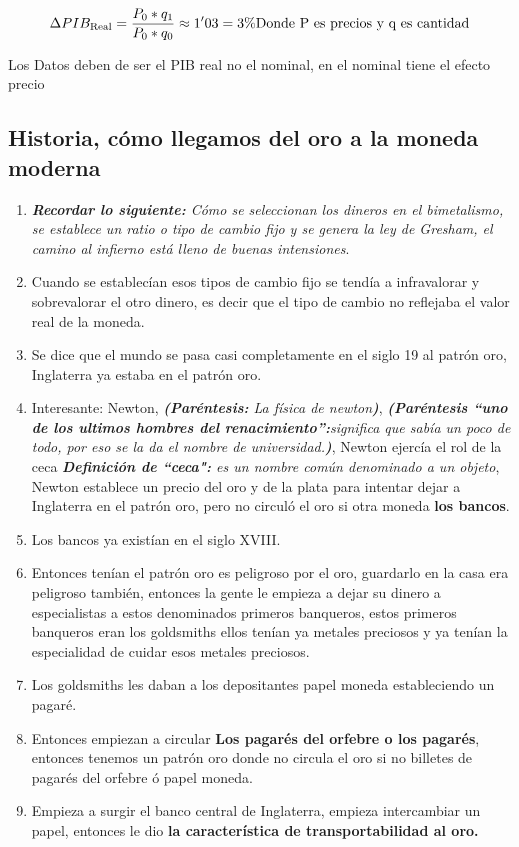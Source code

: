 \[
    \Delta PIB_{\text{Real}} = \frac{P_{0}*q_{1}}{P_{0}*q_{0}} \approx 1'03 = 3\% \\ 
    \text{Donde P es precios y q es cantidad}
\]

Los Datos deben de ser el PIB real no el nominal, en el nominal tiene el efecto precio  




\subsection{Historia, cómo llegamos del oro a la moneda moderna}
\begin{enumerate}
    \item \emph{\textbf{Recordar lo siguiente: }Cómo se seleccionan los dineros en el bimetalismo, se establece un ratio o tipo de cambio fijo y se genera la ley de Gresham, el camino al infierno está lleno de buenas intensiones}.
    \item Cuando se establecían esos tipos de cambio fijo se tendía a infravalorar y sobrevalorar el otro dinero, es decir que el tipo de cambio no reflejaba el valor real de la moneda.
    \item Se dice que el mundo se pasa casi completamente en el siglo 19 al patrón oro, Inglaterra ya estaba en el patrón oro.
    \item Interesante: Newton, \emph{\textbf{(Paréntesis:} La física de newton\textbf{)}}, \emph{\textbf{(Paréntesis ``uno de los ultimos hombres del renacimiento'':}significa que sabía un poco de todo, por eso se la da el nombre de universidad.\textbf{)}}, Newton ejercía el rol de la ceca \emph{\textbf{Definición de ``ceca":} es un nombre común denominado a un objeto}, Newton establece un precio del oro y de la plata para intentar dejar a Inglaterra en el patrón oro, pero no circuló el oro si otra moneda \textbf{los bancos}. 
    \item Los bancos ya existían en el siglo XVIII.
    \item Entonces tenían el patrón oro es peligroso por el oro, guardarlo en la casa era peligroso también, entonces la gente le empieza a dejar su dinero a especialistas a estos denominados primeros banqueros, estos primeros banqueros eran los goldsmiths ellos tenían ya metales preciosos y ya tenían la especialidad de cuidar esos metales preciosos.
    \item Los goldsmiths les daban a los depositantes papel moneda estableciendo un pagaré.
    \item Entonces empiezan a circular \textbf{Los pagarés del orfebre o los pagarés}, entonces tenemos un patrón oro donde no circula el oro si no billetes de pagarés del orfebre ó papel moneda.
    \item Empieza a surgir el banco central de Inglaterra, empieza intercambiar un papel, entonces le dio \textbf{la característica de transportabilidad al oro.}
\end{enumerate}
